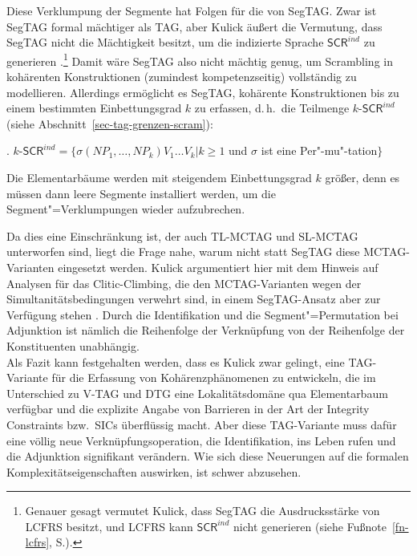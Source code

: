 Diese Verklumpung der Segmente hat Folgen für die  von SegTAG. Zwar ist SegTAG formal mächtiger als TAG, aber Kulick äu\ss ert die Vermutung, dass SegTAG nicht die Mächtigkeit besitzt, um die indizierte Sprache $\mathsf{SCR}^{ind}$ zu generieren \cite[215]{Kulick:00}.\footnote{Genauer gesagt vermutet Kulick, dass SegTAG die Ausdrucksstärke von LCFRS besitzt, und LCFRS kann $\mathsf{SCR}^{ind}$ nicht generieren (siehe Fußnote~\ref{fn-lcfrs}, S.\pageref{fn-lcfrs}).} Damit wäre SegTAG also nicht mächtig genug, um Scrambling in kohärenten Konstruktionen (zumindest kompetenzseitig) vollständig zu modellieren. Allerdings ermöglicht es SegTAG, kohärente Konstruktionen bis zu einem bestimmten Einbettungsgrad $k$ zu erfassen, d.\,h.\ die Teilmenge $k$-$\mathsf{SCR}^{ind}$ (siehe Abschnitt~\ref{sec-tag-grenzen-scram}):

\ex. $k$-$\mathsf{SCR}^{ind} = \{ \sigma(\mathit{NP}_1,\ldots,\mathit{NP}_k) V_1 \ldots V_k | k \geq 1$ und $\sigma$ ist eine Per"-mu"-tation$\}$

Die Elementarbäume werden mit steigendem Einbettungsgrad $k$ grö\ss er, denn es müssen dann leere Segmente installiert werden, um die Segment"=Verklumpungen wieder aufzubrechen. 

Da dies eine Einschränkung ist, der auch TL-MCTAG und SL-MCTAG unterworfen sind, liegt die Frage nahe, warum nicht statt SegTAG diese MCTAG-Varianten eingesetzt werden. Kulick argumentiert hier mit dem Hinweis auf Analysen für das Clitic-Climbing, die den MCTAG-Varianten wegen der Simultanitätsbedingungen verwehrt sind, in einem SegTAG-Ansatz aber zur Verfügung stehen \cite[53ff]{Kulick:00}. Durch die Identifikation und die Segment"=Permutation bei Adjunktion ist nämlich die Reihenfolge der Verknüpfung von der Reihenfolge der Konstituenten unabhängig.  \\     

Als Fazit kann festgehalten werden, dass es Kulick zwar gelingt, eine TAG-Variante für die Erfassung von Kohärenzphänomenen zu entwickeln, die im Unterschied zu V-TAG und DTG eine Lokalitätsdomäne qua Elementarbaum verfügbar und die explizite Angabe von Barrieren in der Art der Integrity Constraints bzw.\ SICs überflüssig macht. Aber diese TAG-Variante muss dafür eine völlig neue Verknüpfungsoperation, die Identifikation, ins Leben rufen und die Adjunktion signifikant verändern. Wie sich diese Neuerungen auf die formalen Komplexitätseigenschaften auswirken, ist schwer abzusehen.


